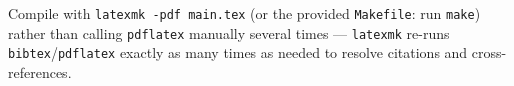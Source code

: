 \begin{tipbox}
      Compile with \texttt{latexmk -pdf main.tex} (or the provided
      \texttt{Makefile}: run \texttt{make}) rather than calling
      \texttt{pdflatex} manually several times --- \texttt{latexmk} re-runs
      \texttt{bibtex}/\texttt{pdflatex} exactly as many times as needed to
      resolve citations and cross-references.
\end{tipbox}
